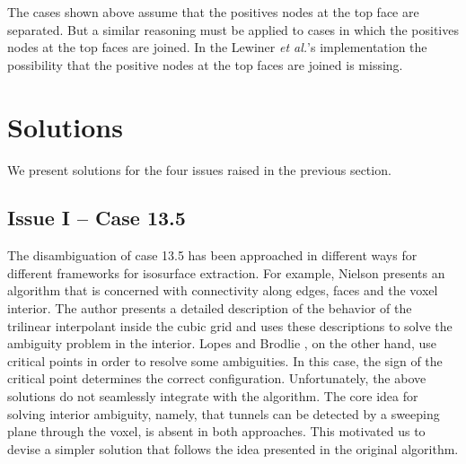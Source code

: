 The cases shown above assume that the positives nodes at the top face are separated. But a similar reasoning must be applied to cases in which the positives nodes at the top faces are joined. In the Lewiner \emph{et al.}'s implementation the possibility that the positive nodes at the top faces are joined is missing. 

\section{Solutions}
\label{sec:solution}
 
We present solutions for the four issues raised in the previous section. 
 
\subsection{Issue I -- Case 13.5}

The disambiguation of case 13.5 has been approached in different ways for different frameworks for isosurface extraction.  For example, Nielson \cite{Nielson03onmarching} presents an algorithm that is  concerned with connectivity along edges, faces and the voxel interior. The author presents a detailed description of the behavior of the trilinear interpolant inside the cubic grid and uses these descriptions to solve the ambiguity problem in the interior. Lopes and Brodlie \cite{lopes:tvcg:2003}, on the other hand, use critical points in order to resolve some ambiguities. In this case, the sign of the critical point determines the correct configuration.
%
Unfortunately, the above solutions do not seamlessly integrate with the \mc{} algorithm. The core idea for solving interior ambiguity, namely, that tunnels can be detected by a sweeping plane through the voxel, is absent in both approaches. This motivated us to devise a simpler solution that follows the idea presented in the original algorithm.

